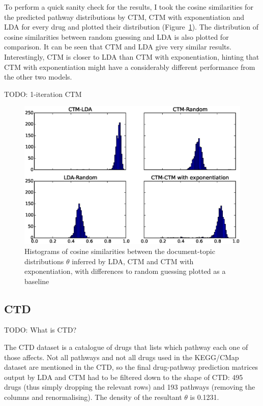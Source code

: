 \documentclass[12pt,a4paper,twoside,openright]{report}
\begin{document}
To perform a quick sanity check for the results, I took the cosine similarities for the predicted pathway distributions by CTM, CTM with exponentiation and LDA for every drug and plotted their distribution (Figure~\ref{fig:ctd-ctm-lda-diffs}). The distribution of cosine similarities between random guessing and LDA is also plotted for comparison. It can be seen that CTM and LDA give very similar results. Interestingly, CTM is closer to LDA than CTM with exponentiation, hinting that CTM with exponentiation might have a considerably different performance from the other two models.

TODO: 1-iteration CTM

\begin{figure}[!htb]
\includegraphics[width=\textwidth]{ctd-ctm-lda-diffs.eps}
\caption{Histograms of cosine similarities between the document-topic distributions $\theta$ inferred by LDA, CTM and CTM with exponentiation, with differences to random guessing plotted as a baseline}
\label{fig:ctd-ctm-lda-diffs}
\end{figure}

\subsection{CTD}

TODO: What is CTD?

The CTD dataset is a catalogue of drugs that lists which pathway each one of those affects. Not all pathways and not all drugs used in the KEGG/CMap dataset are mentioned in the CTD, so the final drug-pathway prediction matrices output by LDA and CTM had to be filtered down to the shape of CTD: 495 drugs (thus simply dropping the relevant rows) and 193 pathways (removing the columns and renormalising). The density of the resultant $\theta$ is 0.1231.
\end{document}

